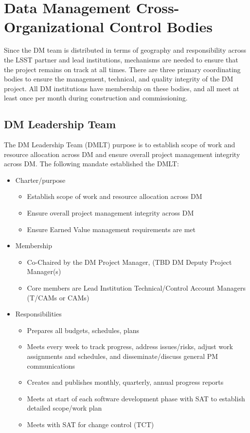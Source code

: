 \section{Data Management Cross-Organizational Control Bodies}
Since the DM team is distributed in terms of geography and responsibility across the LSST partner and lead institutions, mechanisms are needed to ensure that the project remains on track at all times.  There are three primary coordinating bodies to ensure the management, technical, and quality integrity of the DM project.  All DM institutions have membership on these bodies, and all meet at least once per month during construction and commissioning.
\subsection{DM Leadership Team}

The DM Leadership Team (DMLT) purpose is to establish scope of work and resource allocation across DM and ensure overall project management integrity across DM.
The following mandate established the DMLT:

\begin{itemize}
\item Charter/purpose
	\begin{itemize}
	\item Establish scope of work and resource allocation across DM
	\item Ensure overall project management integrity across DM
	\item Ensure Earned Value management requirements are met
	\end{itemize}
\item Membership
	\begin{itemize}
	\item Co-Chaired by the DM Project Manager, (TBD DM Deputy Project Manager(s)
	\item Core members are Lead Institution Technical/Control Account Managers (T/CAMs or CAMs)
	\end{itemize}
\item Responsibilities
	\begin{itemize}
	\item Prepares all budgets, schedules, plans
	\item Meets every week to track progress, address issues/risks, adjust work assignments and schedules, and disseminate/discuss general PM communications
	\item Creates and publishes monthly, quarterly, annual progress reports
	\item Meets at start of each software development phase with SAT to establish detailed scope/work plan
	\item Meets with SAT for change control (TCT)
	\end{itemize}
\end{itemize}


